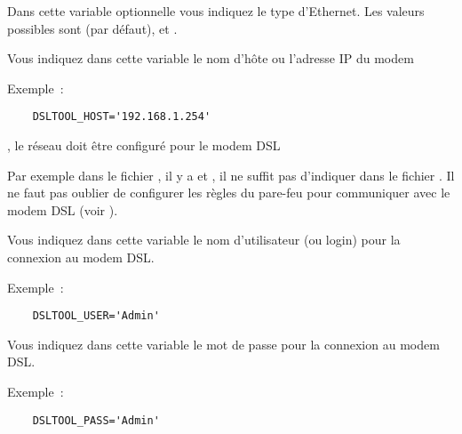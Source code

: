 \begin{description}

  Dans cette variable optionnelle vous indiquez le type d'Ethernet.
  Les valeurs possibles sont  (par défaut),  et .


  Vous indiquez dans cette variable le nom d'hôte ou l'adresse IP du modem

  Exemple~:

\begin{example}
\begin{verbatim}
    DSLTOOL_HOST='192.168.1.254'
\end{verbatim}
\end{example}

  , le réseau doit être configuré pour le modem DSL

  Par exemple dans le fichier , il y a 
  et , il ne suffit pas d'indiquer 
  dans le fichier . Il ne faut pas oublier de configurer les règles
  du pare-feu pour communiquer avec le modem DSL (voir ).


  Vous indiquez dans cette variable le nom d'utilisateur (ou login) pour la
  connexion au modem DSL.

  Exemple~:

\begin{example}
\begin{verbatim}
    DSLTOOL_USER='Admin'
\end{verbatim}
\end{example}


  Vous indiquez dans cette variable le mot de passe pour la connexion 
  au modem DSL.

  Exemple~:

\begin{example}
\begin{verbatim}
    DSLTOOL_PASS='Admin'
\end{verbatim}
\end{example}



\end{description}
